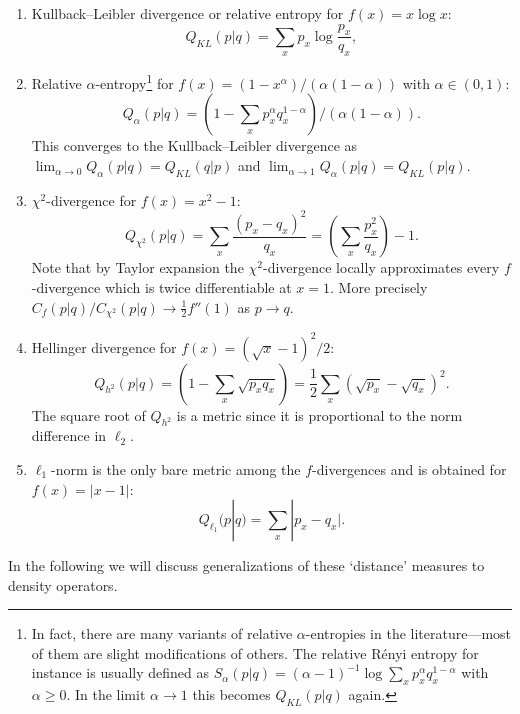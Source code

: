 \documentclass[11pt,a4paper]{article}
\theoremstyle{plain}
\theoremstyle{definition}
\theoremstyle{remark}
\begin{document}
\begin{enumerate}
    \item Kullback--Leibler divergence or relative entropy for $f(x)=x\log x$:
          \begin{equation}\tag{8.27}
              Q_{KL}(p|q) = \sum_x p_x \log\frac{p_x}{q_x},
          \end{equation}

    \item Relative $\alpha$-entropy\footnote{In fact, there are many variants of relative $\alpha$-entropies in the literature---most of them
              are slight modifications of others. The relative R\'enyi entropy for instance is usually defined as
              $S_\alpha(p|q)=(\alpha-1)^{-1}\log\sum_x p_x^\alpha q_x^{1-\alpha}$ with $\alpha\ge 0$. In the limit $\alpha\to 1$ this becomes $Q_{KL}(p|q)$ again.}
          for $f(x)=(1-x^\alpha)/(\alpha(1-\alpha))$ with $\alpha\in(0,1)$:
          \begin{equation}\tag{8.28}
              Q_\alpha(p|q) = \left(1-\sum_x p_x^\alpha q_x^{1-\alpha}\right)\big/(\alpha(1-\alpha)).
          \end{equation}
          This converges to the Kullback--Leibler divergence as $\lim_{\alpha\to 0}Q_\alpha(p|q)=Q_{KL}(q|p)$ and
          $\lim_{\alpha\to 1}Q_\alpha(p|q)=Q_{KL}(p|q)$.

    \item $\chi^2$-divergence for $f(x)=x^2-1$:
          \begin{equation}\tag{8.29}
              Q_{\chi^2}(p|q) = \sum_x \frac{(p_x-q_x)^2}{q_x} = \left(\sum_x \frac{p_x^2}{q_x}\right)-1.
          \end{equation}
          Note that by Taylor expansion the $\chi^2$-divergence locally approximates every $f$-divergence which is twice differentiable at $x=1$.
          More precisely $C_f(p|q)/C_{\chi^2}(p|q)\to \frac{1}{2}f''(1)$ as $p\to q$.

    \item Hellinger divergence for $f(x)=(\sqrt{x}-1)^2/2$:
          \begin{equation}\tag{8.30}
              Q_{h^2}(p|q) = \left(1-\sum_x \sqrt{p_x q_x}\right) = \frac{1}{2}\sum_x (\sqrt{p_x}-\sqrt{q_x})^2.
          \end{equation}
          The square root of $Q_{h^2}$ is a metric since it is proportional to the norm difference in $\ell_2$.

    \item $\ell_1$-norm is the only bare metric among the $f$-divergences and is obtained for $f(x)=|x-1|$:
          \begin{equation}\tag{8.31}
              Q_{\ell_1}(p|q) = \sum_x |p_x-q_x|.
          \end{equation}
\end{enumerate}
In the following we will discuss generalizations of these `distance' measures to density operators.
\end{document}
